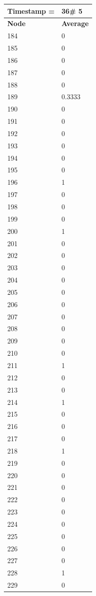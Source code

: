 \begin{tabular}{|l||l|}
\hline
\textbf{Timestamp =} & \textbf{36}\# 5\\\hline
	\textbf{Node} & \textbf{Average} \\ \hline
\hline
	184 & 0 \\ \hline
	185 & 0 \\ \hline
	186 & 0 \\ \hline
	187 & 0 \\ \hline
	188 & 0 \\ \hline
	189 & 0.3333 \\ \hline
	190 & 0 \\ \hline
	191 & 0 \\ \hline
	192 & 0 \\ \hline
	193 & 0 \\ \hline
	194 & 0 \\ \hline
	195 & 0 \\ \hline
	196 & 1 \\ \hline
	197 & 0 \\ \hline
	198 & 0 \\ \hline
	199 & 0 \\ \hline
	200 & 1 \\ \hline
	201 & 0 \\ \hline
	202 & 0 \\ \hline
	203 & 0 \\ \hline
	204 & 0 \\ \hline
	205 & 0 \\ \hline
	206 & 0 \\ \hline
	207 & 0 \\ \hline
	208 & 0 \\ \hline
	209 & 0 \\ \hline
	210 & 0 \\ \hline
	211 & 1 \\ \hline
	212 & 0 \\ \hline
	213 & 0 \\ \hline
	214 & 1 \\ \hline
	215 & 0 \\ \hline
	216 & 0 \\ \hline
	217 & 0 \\ \hline
	218 & 1 \\ \hline
	219 & 0 \\ \hline
	220 & 0 \\ \hline
	221 & 0 \\ \hline
	222 & 0 \\ \hline
	223 & 0 \\ \hline
	224 & 0 \\ \hline
	225 & 0 \\ \hline
	226 & 0 \\ \hline
	227 & 0 \\ \hline
	228 & 1 \\ \hline
	229 & 0 \\ \hline
\end{tabular}

